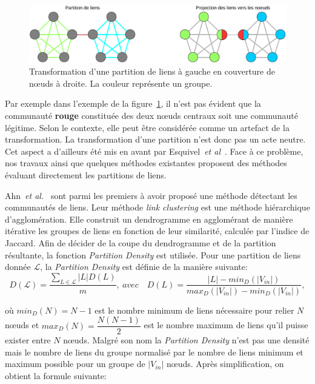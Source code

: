 \begin{figure}
\centering
\includegraphics[width=0.9\linewidth]{img/ExpectedNodes/Partition_Couverture}
\caption{Transformation d'une partition de liens à gauche en couverture de n\oe uds à droite. La couleur représente un groupe.}
\label{fig:Partition_Couverture}
\end{figure}


Par exemple dans l'exemple de la figure~\ref{fig:Partition_Couverture}, il n'est pas évident que la communauté \textcolor{briquered}{\textbf{rouge}} constituée des deux n\oe uds centraux soit une communauté légitime.
Selon le contexte, elle peut être considérée comme un artefact de la transformation.
La transformation d'une partition n'est donc pas un acte neutre.
Cet aspect a d'ailleurs été mis en avant par Esquivel~\emph{et al}~\cite{Esquivel2011}.
Face à ce problème, nos travaux ainsi que quelques méthodes existantes proposent des méthodes évaluant directement les partitions de liens.

Ahn~\emph{et al.}~\cite{Ahn2010a} sont parmi les premiers à avoir proposé une méthode détectant les communautés de liens.
Leur méthode \emph{link clustering} est une méthode hiérarchique d'agglomération.
Elle construit un dendrogramme en agglomérant de manière itérative les groupes de liens en fonction de leur similarité, calculée par l'indice de Jaccard.
Afin de décider de la coupe du dendrogramme et de la partition résultante, la fonction \emph{Partition Density} est utilisée.
Pour une partition de liens donnée $\mathcal{L}$, la \emph{Partition Density} est définie de la manière suivante:
\begin{equation}
D(\mathcal{L}) = \dfrac{\sum_{L \in \mathcal{L}}|L|D(L)}{m},\ avec \quad  D(L) = \dfrac{|L|- min_D(|V_{in}|) }{max_D(|V_{in}|) - min_D(|V_{in}|)},
\end{equation}

où $min_D(N) = N - 1$ est le nombre minimum de liens nécessaire pour relier $N$ n\oe uds et $max_D(N) = \dfrac{N(N - 1)}{2}$ est le nombre maximum de liens qu'il puisse exister entre $N$ n\oe uds.
Malgré son nom la \emph{Partition Density} n'est pas une densité mais le nombre de liens du groupe normalisé par le nombre de liens minimum et maximum possible pour un groupe de $|V_{in}|$ n\oe uds.
Après simplification, on obtient la formule suivante:

